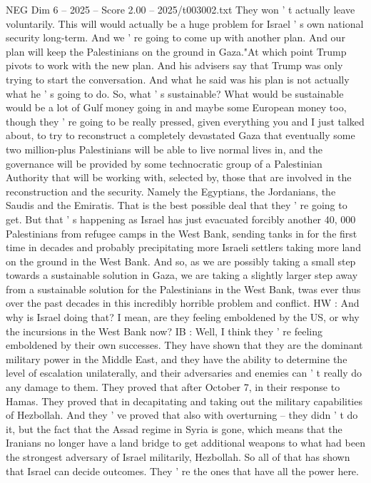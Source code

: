 \begin{textsample}{NEG Dim 6 – 2025 – Score 2.00 – 2025/t003002.txt}
They won ' t actually leave voluntarily.
This will would actually be a huge problem for Israel ' s own national security long-term.
And we ' re going to come up with another plan.
And our plan will keep the Palestinians on the ground in Gaza."At which point Trump pivots to work with the new plan.
And his advisers say that Trump was only trying to start the conversation.
And what he said was his plan is not actually what he ' s going to do.
So, what ' s sustainable?
What would be sustainable would be a lot of Gulf money going in and maybe some European money too, though they ' re going to be really pressed, given everything you and I just talked about, to try to reconstruct a completely devastated Gaza that eventually some two million-plus Palestinians will be able to live normal lives in, and the governance will be provided by some technocratic group of a Palestinian Authority that will be working with, selected by, those that are involved in the reconstruction and the security.
Namely the Egyptians, the Jordanians, the Saudis and the Emiratis.
That is the best possible deal that they ' re going to get.
But that ' s happening as Israel has just evacuated forcibly another 40, 000 Palestinians from refugee camps in the West Bank, sending tanks in for the first time in decades and probably precipitating more Israeli settlers taking more land on the ground in the West Bank.
And so, as we are possibly taking a small step towards a sustainable solution in Gaza, we are taking a slightly larger step away from a sustainable solution for the Palestinians in the West Bank, twas ever thus over the past decades in this incredibly horrible problem and conflict.
HW : And why is Israel doing that?
I mean, are they feeling emboldened by the US, or why the incursions in the West Bank now?
IB : Well, I think they ' re feeling emboldened by their own successes.
They have shown that they are the dominant military power in the Middle East, and they have the ability to determine the level of escalation unilaterally, and their adversaries and enemies can ' t really do any damage to them.
They proved that after October 7, in their response to Hamas.
They proved that in decapitating and taking out the military capabilities of Hezbollah.
And they ' ve proved that also with overturning -- they didn ' t do it, but the fact that the Assad regime in Syria is gone, which means that the Iranians no longer have a land bridge to get additional weapons to what had been the strongest adversary of Israel militarily, Hezbollah.
So all of that has shown that Israel can decide outcomes.
They ' re the ones that have all the power here.

\end{textsample}
